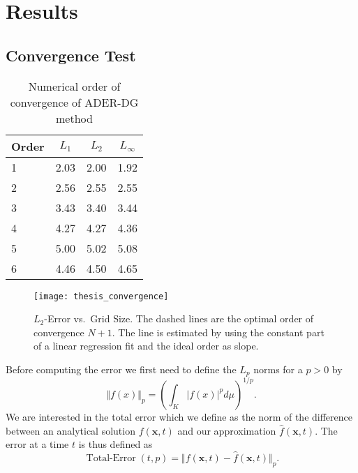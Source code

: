 \chapter{Results}\label{chap:results}
\section{Convergence Test}
\begin{table}[htb]
  \centering
\caption{Numerical order of convergence of ADER-DG method}%
\label{tab:convergence-order}
\begin{tabular}{@{}lS[table-format=1.2]S[table-format=1.2]S[table-format=1.2]@{}}
\toprule
{Order} & {$L_1$} & {$L_2$} & {$L_\infty$}\\  & 2.03 & 2.00 & 1.92\\
2 & 2.56 & 2.55 & 2.55\\
3 & 3.43 & 3.40 & 3.44\\
4 & 4.27 & 4.27 & 4.36\\
5 & 5.00 & 5.02 & 5.08\\
6 & 4.46 & 4.50 & 4.65\\
\bottomrule
\end{tabular}
\end{table}

\begin{figure}[htb]
  \centering
  \texttt{[image: thesis\_convergence]}
  \caption{$L_2$-Error vs.\ Grid Size.
    The dashed lines are the optimal order of convergence $N+1$.
  The line is estimated by using the constant part of a linear regression fit and the ideal order as slope.}
  \label{fig:convergence-l2-error}
\end{figure}

\newcommand{\error}{\operatorname{Total-Error}}

Before computing the error we first need to define the $L_p$ norms for a $p > 0$ by
\begin{equation}
  \label{eq:Lp-nrom}
  \Vert f(x) \Vert_p = \left( \int_K \vert f(x) \vert^p d\mu  \right)^{1/p}.
\end{equation}
We are interested in the total error which we define as the norm of the difference between an analytical solution $f(\bm{x}, t)$ and our approximation $\hat{f}(\bm{x}, t)$.
The error at a time $t$ is thus defined as
\begin{equation}
  \label{eq:error}
  \error(t,p) = \Vert f(\bm{x}, t) - \hat{f}(\bm{x}, t) \Vert_p.
\end{equation}

